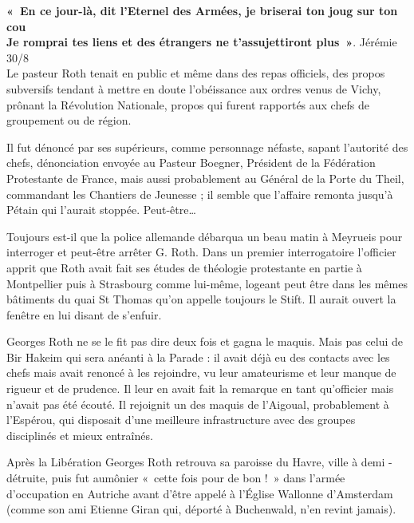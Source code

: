 \textbf{«~En ce jour-là, dit l’Eternel des Armées, je briserai ton joug sur ton cou}\\
\textbf{Je romprai tes liens et des étrangers ne t’assujettiront plus~»}.
\hfill Jérémie 30/8\\

Le pasteur Roth tenait en public et même dans des repas officiels, des propos subversifs
tendant à mettre en doute l’obéissance aux ordres venus de Vichy, prônant la Révolution
Nationale, propos qui furent rapportés aux chefs de groupement ou de région.

Il fut dénoncé par ses supérieurs, comme personnage néfaste, sapant l’autorité des chefs,
dénonciation envoyée au Pasteur Boegner, Président de la Fédération Protestante de France,
mais aussi probablement au Général de la Porte du Theil, commandant les Chantiers de
Jeunesse ; il semble que l’affaire remonta jusqu’à Pétain qui l’aurait stoppée. Peut-être…

Toujours est-il que la police allemande débarqua un beau matin à Meyrueis pour interroger et
peut-être arrêter G. Roth. Dans un premier interrogatoire l’officier apprit que Roth avait fait
ses études de théologie protestante en partie à Montpellier puis à Strasbourg comme lui-même,
logeant peut être dans les mêmes bâtiments du quai St Thomas qu’on appelle toujours le Stift.
Il aurait ouvert la fenêtre en lui disant de s’enfuir.

Georges Roth ne se le fit pas dire deux fois et gagna le maquis. Mais pas celui de Bir Hakeim
qui sera anéanti à la Parade : il avait déjà eu des contacts avec les chefs mais avait renoncé à
les rejoindre, vu leur amateurisme et leur manque de rigueur et de prudence. Il leur en avait
fait la remarque en tant qu’officier mais n’avait pas été écouté.
Il rejoignit un des maquis de l’Aigoual, probablement à l’Espérou, qui disposait d’une
meilleure infrastructure avec des groupes disciplinés et mieux entraînés.

Après la Libération Georges Roth retrouva sa paroisse du Havre, ville à demi - détruite, puis
fut aumônier «~cette fois pour de bon !~» dans l’armée d’occupation en Autriche avant d’être
appelé à l’Église Wallonne d’Amsterdam (comme son ami Etienne Giran qui, déporté à
Buchenwald, n’en revint jamais).

\bigskip


